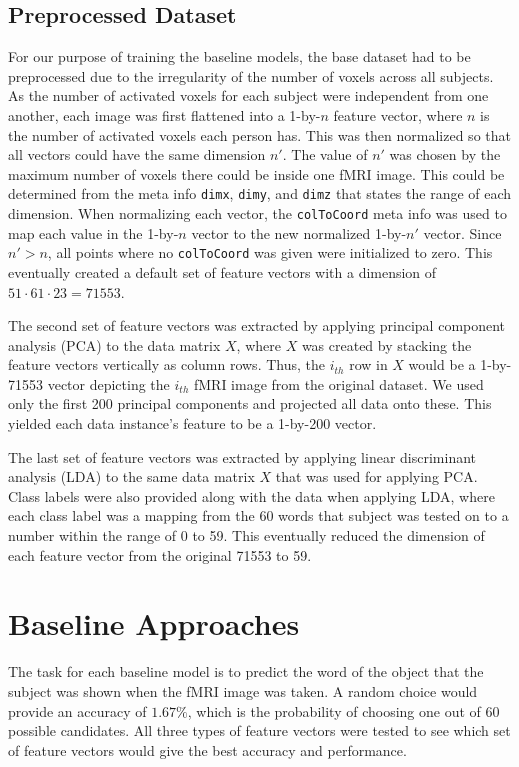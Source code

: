 \documentclass{article} %
\def\code#1{\texttt{#1}}
\begin{document}
\subsection{Preprocessed Dataset}

For our purpose of training the baseline models, the base dataset had to be preprocessed due to the irregularity of the number of voxels across all subjects. As the number of activated voxels for each subject were independent from one another, each image was first flattened into a 1-by-$n$ feature vector, where $n$ is the number of activated voxels each person has. This was then normalized so that all vectors could have the same dimension $n'$. The value of $n'$ was chosen by the maximum number of voxels there could be inside one fMRI image. This could be determined from the meta info \code{dimx}, \code{dimy}, and \code{dimz} that states the range of each dimension. When normalizing each vector, the \code{colToCoord} meta info was used to map each value in the 1-by-$n$ vector to the new normalized 1-by-$n'$ vector. Since $n' > n$, all points where no \code{colToCoord} was given were initialized to zero. This eventually created a default set of feature vectors with a dimension of $51 \cdot 61 \cdot 23 = 71553$.

The second set of feature vectors was extracted by applying principal component analysis (PCA) to the data matrix $X$, where $X$ was created by stacking the feature vectors vertically as column rows. Thus, the $i_{th}$ row in $X$ would be a 1-by-71553 vector depicting the $i_{th}$ fMRI image from the original dataset. We used only the first 200 principal components and projected all data onto these. This yielded each data instance's feature to be a 1-by-200 vector.

The last set of feature vectors was extracted by applying linear discriminant analysis (LDA) to the same data matrix $X$ that was used for applying PCA. Class labels were also provided along with the data when applying LDA, where each class label was a mapping from the 60 words that subject was tested on to a number within the range of 0 to 59. This eventually reduced the dimension of each feature vector from the original 71553 to 59.

\section{Baseline Approaches}

The task for each baseline model is to predict the word of the object that the subject was shown when the fMRI image was taken. A random choice would provide an accuracy of $1.67\%$, which is the probability of choosing one out of 60 possible candidates. All three types of feature vectors were tested to see which set of feature vectors would give the best accuracy and performance.
\end{document}
